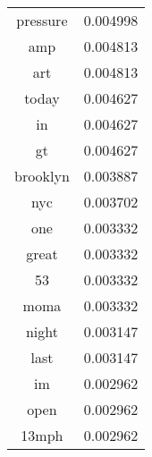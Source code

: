 \documentclass[12pt]{amsart}
\newcommand{\0}{\mat{0}}
\newcommand{\1}{\mathds{1}}
\begin{document}
\begin{table}[!h]
\begin{minipage}{.5\linewidth}
{\begin{tabular}{|c|c|}
                pressure & 0.004998 \\
                amp & 0.004813\\
                art & 0.004813\\
                today & 0.004627\\
                in & 0.004627\\
                gt & 0.004627\\
                brooklyn & 0.003887\\
                nyc & 0.003702\\
                one & 0.003332 \\
                great & 0.003332 \\
                53 & 0.003332\\
                moma & 0.003332\\
                night & 0.003147\\
                last & 0.003147\\ 
                im & 0.002962\\ 
                open & 0.002962\\ 
                13mph & 0.002962 \\
                \hline
            \end{tabular}
        }
    \end{minipage}
\end{table}	
\end{document}
